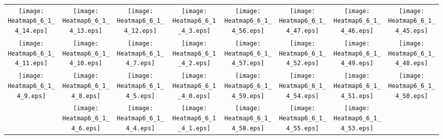 \documentclass{standalone}
\begin{document}
\begin{tabular}{ *8{c} }
\texttt{[image: Heatmap6\_6\_1\_4\_14.eps]} & \texttt{[image: Heatmap6\_6\_1\_4\_13.eps]} & \texttt{[image: Heatmap6\_6\_1\_4\_12.eps]} & \texttt{[image: Heatmap6\_6\_1\_4\_3.eps]} & \texttt{[image: Heatmap6\_6\_1\_4\_56.eps]} & \texttt{[image: Heatmap6\_6\_1\_4\_47.eps]} & \texttt{[image: Heatmap6\_6\_1\_4\_46.eps]} & \texttt{[image: Heatmap6\_6\_1\_4\_45.eps]} \\
\texttt{[image: Heatmap6\_6\_1\_4\_11.eps]} & \texttt{[image: Heatmap6\_6\_1\_4\_10.eps]} & \texttt{[image: Heatmap6\_6\_1\_4\_7.eps]} & \texttt{[image: Heatmap6\_6\_1\_4\_2.eps]} & \texttt{[image: Heatmap6\_6\_1\_4\_57.eps]} & \texttt{[image: Heatmap6\_6\_1\_4\_52.eps]} & \texttt{[image: Heatmap6\_6\_1\_4\_49.eps]} & \texttt{[image: Heatmap6\_6\_1\_4\_48.eps]} \\
\texttt{[image: Heatmap6\_6\_1\_4\_9.eps]} & \texttt{[image: Heatmap6\_6\_1\_4\_8.eps]} & \texttt{[image: Heatmap6\_6\_1\_4\_5.eps]} & \texttt{[image: Heatmap6\_6\_1\_4\_0.eps]} & \texttt{[image: Heatmap6\_6\_1\_4\_59.eps]} & \texttt{[image: Heatmap6\_6\_1\_4\_54.eps]} & \texttt{[image: Heatmap6\_6\_1\_4\_51.eps]} & \texttt{[image: Heatmap6\_6\_1\_4\_50.eps]} \\
 & \texttt{[image: Heatmap6\_6\_1\_4\_6.eps]} & \texttt{[image: Heatmap6\_6\_1\_4\_4.eps]} & \texttt{[image: Heatmap6\_6\_1\_4\_1.eps]} & \texttt{[image: Heatmap6\_6\_1\_4\_58.eps]} & \texttt{[image: Heatmap6\_6\_1\_4\_55.eps]} & \texttt{[image: Heatmap6\_6\_1\_4\_53.eps]} &  
\end{tabular}
\end{document}
